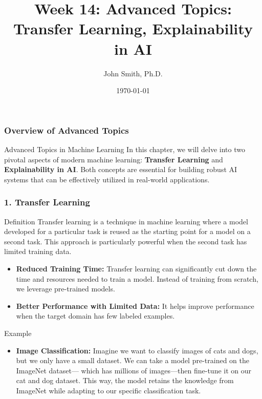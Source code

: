 \documentclass[aspectratio=169]{beamer}
\title[Week 14: Transfer Learning and Explainability]{Week 14: Advanced Topics: Transfer Learning, Explainability in AI}
\author[J. Smith]{John Smith, Ph.D.}
\institute[University Name]{
  Department of Computer Science\\
  University Name\\
  \vspace{0.3cm}
  Email: email@university.edu\\
  Website: www.university.edu
}
\date{\today}
\begin{document}
\frame{\titlepage}

\begin{frame}[fragile]
    \titlepage
\end{frame}

\begin{frame}[fragile]
    \frametitle{Overview of Advanced Topics}
    \begin{block}{Advanced Topics in Machine Learning}
        In this chapter, we will delve into two pivotal aspects of modern machine learning: 
        \textbf{Transfer Learning} and \textbf{Explainability in AI}. 
        Both concepts are essential for building robust AI systems that can be effectively utilized in real-world applications.
    \end{block}
\end{frame}

\begin{frame}[fragile]
    \frametitle{1. Transfer Learning}
    \begin{block}{Definition}
        Transfer learning is a technique in machine learning where a model developed for a particular task is reused as the starting point for a model on a second task. 
        This approach is particularly powerful when the second task has limited training data.
    \end{block}
    
    \begin{itemize}
        \item \textbf{Reduced Training Time:} 
            Transfer learning can significantly cut down the time and resources needed to train a model. Instead of training from scratch, we leverage pre-trained models.
        
        \item \textbf{Better Performance with Limited Data:} 
            It helps improve performance when the target domain has few labeled examples.
    \end{itemize}

    \begin{block}{Example}
        \begin{itemize}
            \item \textbf{Image Classification:} 
                Imagine we want to classify images of cats and dogs, but we only have a small dataset. 
                We can take a model pre-trained on the ImageNet dataset— which has millions of images—then fine-tune it on our cat and dog dataset. 
                This way, the model retains the knowledge from ImageNet while adapting to our specific classification task.
        \end{itemize}
    \end{block}
\end{frame}
\end{document}
